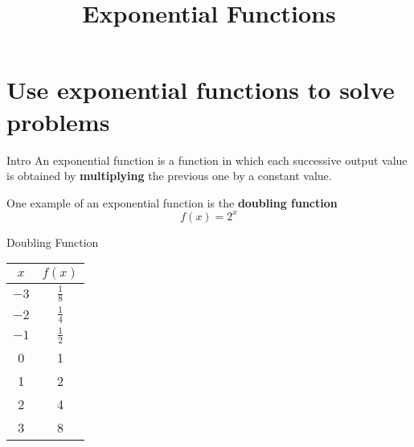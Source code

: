 \documentclass[t,usenames,dvipsnames]{beamer}
\title{Exponential Functions}
\author{}
\date{}
\begin{document}
\begin{frame}
    \maketitle
\end{frame}

\section{Use exponential functions to solve problems}

\begin{frame}{Intro}
An \alert{exponential function} is a function in which each successive output value is obtained by {\color{violet}\textbf{multiplying}} the previous one by a constant value. \newline\\   \pause

One example of an exponential function is the {\color{blue}\textbf{doubling function}}
\[ f(x) = 2^x \]
\end{frame}

\begin{frame}{Doubling Function}
\begin{minipage}{0.6\textwidth}
\end{minipage}
\hspace{1cm}
\begin{minipage}{0.25\textwidth}
\setlength{\extrarowheight}{5pt}
\begin{tabular}{c|c}
    $x$ & $f(x)$ \\ \hline 
    $-3$ & $\tfrac{1}{8}$ \\[5pt]
    $-2$ & $\tfrac{1}{4}$ \\[5pt]
    $-1$ & $\tfrac{1}{2}$ \\[5pt]
    0   &   1   \\[5pt]
    1   &   2   \\[5pt]
    2   &   4   \\[5pt]
    3   &   8   
\end{tabular}
\end{minipage}
\end{frame}
\end{document}
